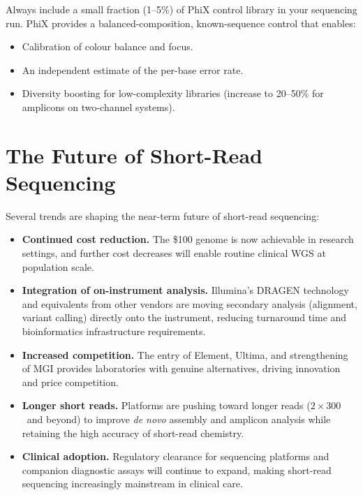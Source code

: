 \begin{tipbox}[title={PhiX Spike-In}]
Always include a small fraction (1--5\%) of PhiX control library in your sequencing run. PhiX provides a balanced-composition, known-sequence control that enables:
\begin{itemize}[nosep]
  \item Calibration of colour balance and focus.
  \item An independent estimate of the per-base error rate.
  \item Diversity boosting for low-complexity libraries (increase to 20--50\% for amplicons on two-channel systems).
\end{itemize}
\end{tipbox}


\section{The Future of Short-Read Sequencing}
\label{sec:shortread_future}

Several trends are shaping the near-term future of short-read sequencing:

\begin{itemize}
  \item \textbf{Continued cost reduction.} The \$100 genome is now achievable in research settings, and further cost decreases will enable routine clinical \gls{WGS} at population scale.

  \item \textbf{Integration of on-instrument analysis.} Illumina's DRAGEN technology and equivalents from other vendors are moving secondary analysis (alignment, variant calling) directly onto the instrument, reducing turnaround time and bioinformatics infrastructure requirements.

  \item \textbf{Increased competition.} The entry of Element, Ultima, and strengthening of MGI provides laboratories with genuine alternatives, driving innovation and price competition.

  \item \textbf{Longer short reads.} Platforms are pushing toward longer reads ($2 \times 300$\basepair\ and beyond) to improve \textit{de novo} assembly and amplicon analysis while retaining the high accuracy of short-read chemistry.

  \item \textbf{Clinical adoption.} Regulatory clearance for sequencing platforms and companion diagnostic assays will continue to expand, making short-read sequencing increasingly mainstream in clinical care.
\end{itemize}

